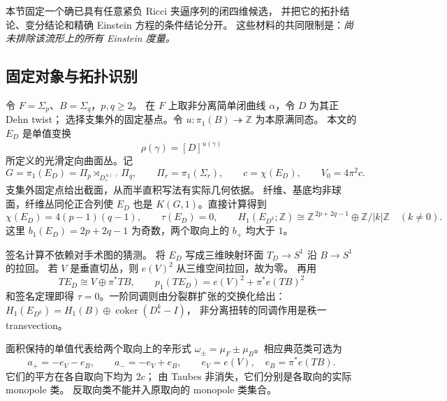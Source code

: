 \documentclass[UTF8,fontset=fandol,zihao=-4,oneside,openany]{ctexbook}
\theoremstyle{cjkplain}
\numberwithin{equation}{chapter}
\begin{document}
本节固定一个确已具有任意紧负 Ricci 夹逼序列的闭四维候选，
并把它的拓扑结论、变分结论和精确 Einstein 方程的条件结论分开。
这些材料的共同限制是：\emph{尚未排除该流形上的所有 Einstein 度量。}

\subsection{固定对象与拓扑识别}
\label{BUNTOP:object}

令 \(F=\Sigma_p\)、\(B=\Sigma_q\)，\(p,q\ge2\)。
在 \(F\) 上取非分离简单闭曲线 \(\alpha\)，令 \(D\) 为其正 Dehn twist；
选择支集外的固定基点。令 \(u:\pi_1(B)\twoheadrightarrow\mathbb Z\) 为本原满同态。
本文的 \(E_D\) 是单值变换
\[
 \rho(\gamma)=[D]^{u(\gamma)}
\]
所定义的光滑定向曲面丛。记
\begin{equation}
 G=\pi_1(E_D)=\Pi_p\rtimes_{D_*^{\,u(\cdot)}}\Pi_q,\qquad
 \Pi_r=\pi_1(\Sigma_r),\qquad
 c=\chi(E_D),\qquad V_0=4\pi^2c .
 \label{BUNTOP:group}
\end{equation}
支集外固定点给出截面，从而半直积写法有实际几何依据。
纤维、基底均非球面，纤维丛同伦正合列使 \(E_D\) 也是
\(K(G,1)\)。直接计算得到
\begin{equation}
 \chi(E_D)=4(p-1)(q-1),\qquad
 \tau(E_D)=0,\qquad
 H_1(E_{D^k};\mathbb Z)
 \cong\mathbb Z^{\,2p+2q-1}\oplus\mathbb Z/|k|\mathbb Z
 \quad(k\ne0).
 \label{BUNTOP:invariants}
\end{equation}
这里 \(b_1(E_D)=2p+2q-1\) 为奇数，两个取向上的 \(b_+\) 均大于 \(1\)。

签名计算不依赖对手术图的猜测。
将 \(E_D\) 写成三维映射环面 \(T_D\to S^1\) 沿 \(B\to S^1\) 的拉回。
若 \(V\) 是垂直切丛，则 \(e(V)^2\) 从三维空间拉回，故为零。
再用
\[
 TE_D\cong V\oplus\pi^*TB,\qquad
 p_1(TE_D)=e(V)^2+\pi^*e(TB)^2
\]
和签名定理即得 \(\tau=0\)。一阶同调则由分裂群扩张的交换化给出：
\(H_1(E_{D^k})=H_1(B)\oplus\operatorname{coker}(D_*^k-I)\)，
非分离扭转的同调作用是秩一 transvection。

面积保持的单值代表给两个取向上的辛形式
\(\omega_\pm=\mu_F\pm\mu_B\)。相应典范类可选为
\begin{equation}
 a_+=-e_V-e_B,\qquad a_-=-e_V+e_B,\qquad
 e_V=e(V),\quad e_B=\pi^*e(TB).
 \label{BUNTOP:canonical}
\end{equation}
它们的平方在各自取向下均为 \(2c\)；
由 Taubes 非消失，它们分别是各取向的实际 monopole 类。
反取向类不能并入原取向的 monopole 类集合。
\end{document}
